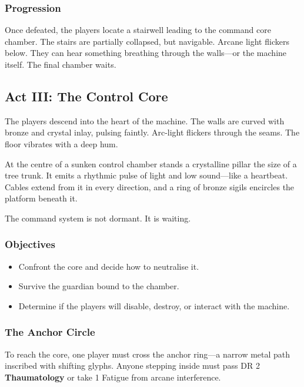 \subsubsection*{Progression}

Once defeated, the players locate a stairwell leading to the command core chamber. The stairs are partially collapsed, but navigable. Arcane light flickers below. They can hear something breathing through the walls—or the machine itself. The final chamber waits.



\subsection{Act III: The Control Core}

The players descend into the heart of the machine. The walls are curved with bronze and crystal inlay, pulsing faintly. Arc-light flickers through the seams. The floor vibrates with a deep hum.

At the centre of a sunken control chamber stands a crystalline pillar the size of a tree trunk. It emits a rhythmic pulse of light and low sound—like a heartbeat. Cables extend from it in every direction, and a ring of bronze sigils encircles the platform beneath it.

The command system is not dormant. It is waiting.

\subsubsection*{Objectives}
\begin{itemize}
    \item Confront the core and decide how to neutralise it.
    \item Survive the guardian bound to the chamber.
    \item Determine if the players will disable, destroy, or interact with the machine.
\end{itemize}

\subsubsection*{The Anchor Circle}

To reach the core, one player must cross the anchor ring—a narrow metal path inscribed with shifting glyphs. Anyone stepping inside must pass DR 2 \textbf{Thaumatology} or take 1 Fatigue from arcane interference.

